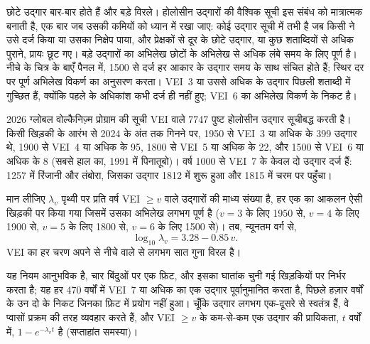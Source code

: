 छोटे उद्गार बार-बार होते हैं और बड़े विरले। होलोसीन उद्गारों की वैश्विक सूची
इस संबंध को मात्रात्मक बनाती है, एक बार जब उसकी
कमियों को ध्यान में रखा जाए: कोई उद्गार सूची में तभी है जब किसी ने उसे दर्ज किया या उसका
निक्षेप पाया, और प्रेक्षकों से दूर के छोटे उद्गार, या कुछ शताब्दियों से अधिक
पुराने, प्रायः छूट गए। बड़े उद्गारों का अभिलेख छोटों के अभिलेख से अधिक लंबे समय के लिए
पूर्ण है। नीचे के चित्र के बाएँ पैनल में, 1500 से दर्ज हर
आकार के उद्गार समय के साथ संचित होते हैं; स्थिर दर पर पूर्ण अभिलेख
विकर्ण का अनुसरण करता। VEI~3 या उससे अधिक के उद्गार पिछली
शताब्दी में गुच्छित हैं, क्योंकि पहले के अधिकांश कभी दर्ज ही नहीं हुए; VEI~6 का अभिलेख
विकर्ण के निकट है।

\begin{dated}{2026}
ग्लोबल वोल्कैनिज़्म प्रोग्राम की सूची VEI वाले \num{7747} पुष्ट होलोसीन
उद्गार सूचीबद्ध करती है। किसी खिड़की के आरंभ से 2024 के अंत तक गिनने पर,
1950 से VEI~3 या अधिक के 399 उद्गार थे, 1900 से VEI~4 या अधिक के 95,
1800 से VEI~5 या अधिक के 22, और 1500 से VEI~6 या अधिक के 8 (सबसे
हाल का, 1991 में पिनातूबो)। वर्ष 1000 से VEI~7 के केवल दो उद्गार दर्ज हैं:
1257 में रिंजानी और तंबोरा, जिसका उद्गार 1812 में शुरू हुआ और 1815 में
चरम पर पहुँचा।
\end{dated}

\begin{proposition}[उद्गारों का आवृत्ति--आकार नियम]\label{prop:b2:eruptive-styles:frequency}
मान लीजिए $\lambda_v$ पृथ्वी पर प्रति वर्ष VEI $\ge v$ वाले उद्गारों की माध्य संख्या है,
हर एक का आकलन ऐसी खिड़की पर किया गया जिसमें उसका अभिलेख लगभग पूर्ण है ($v = 3$ के लिए 1950
से, $v = 4$ के लिए 1900 से, $v = 5$ के लिए 1800 से, $v = 6$ के लिए 1500 से)। तब, न्यूनतम
वर्ग से,
\[
\log_{10}\lambda_v = 3.28 - 0.85\,v .
\]
VEI का हर चरण अपने से नीचे वाले से लगभग सात गुना विरल है।
\end{proposition}

यह नियम आनुभविक है, चार बिंदुओं पर एक फ़िट, और इसका घातांक चुनी गई
खिड़कियों पर निर्भर करता है; यह हर \num{470} वर्षों में VEI~7 या अधिक का एक उद्गार पूर्वानुमानित करता है,
पिछले हज़ार वर्षों के उन दो के निकट जिनका फ़िट में प्रयोग नहीं हुआ। चूँकि
उद्गार लगभग एक-दूसरे से स्वतंत्र हैं, वे प्वासों प्रक्रम की तरह व्यवहार करते हैं,
और VEI $\ge v$ के कम-से-कम एक उद्गार की प्रायिकता, $t$ वर्षों में,
$1 - e^{-\lambda_vt}$ है (सप्ताहांत समस्या)।

